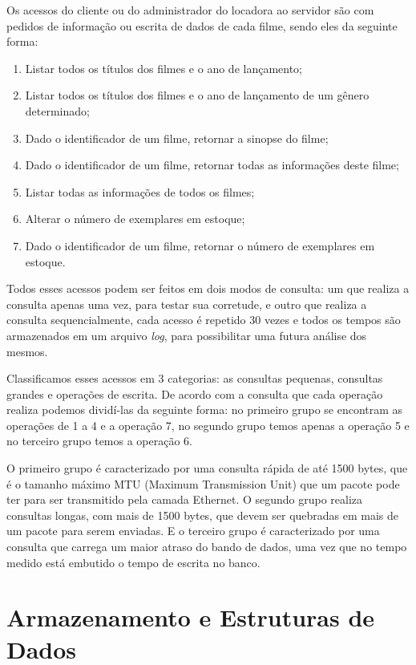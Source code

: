 \documentclass[12pt,a4paper]{article}
\newenvironment{myenumerate}{
\begin{enumerate}
 \setlength{\itemsep}{1pt}
 \setlength{\parskip}{0pt}
 \setlength{\parsep}{0pt}
}{\end{enumerate}}
\begin{document}
Os acessos do cliente ou do administrador do locadora ao servidor são com pedidos de informação ou escrita de dados de cada filme, sendo eles da seguinte forma:

\begin {myenumerate}
\item Listar todos os títulos dos filmes e o ano de lançamento;
\item Listar todos os títulos dos filmes e o ano de lançamento de um gênero determinado;
\item Dado o identificador de um filme, retornar a sinopse do filme;
\item Dado o identificador de um filme, retornar todas as informações deste filme;
\item Listar todas as informações de todos os filmes;
\item Alterar o número de exemplares em estoque;
\item Dado o identificador de um filme, retornar o número de exemplares
em estoque.
\end{myenumerate}

    Todos esses acessos podem ser feitos em dois modos de consulta: um que realiza a consulta apenas uma vez, para testar sua corretude, e outro que realiza a consulta sequencialmente, cada acesso é repetido 30 vezes e todos os tempos são armazenados em um arquivo {\it log}, para possibilitar uma futura análise dos mesmos.
    
    Classificamos esses acessos em 3 categorias: as consultas pequenas, consultas grandes e operações de escrita. De acordo com a consulta que cada operação realiza podemos dividí-las da seguinte forma: no primeiro grupo se encontram as operações de 1 a 4 e a operação 7, no segundo grupo temos apenas a operação 5 e no terceiro grupo temos a operação 6. 
    
O primeiro grupo é caracterizado por uma consulta rápida de até 1500 bytes, que é o tamanho máximo MTU (Maximum Transmission Unit) que um pacote pode ter para ser transmitido pela camada Ethernet. O segundo grupo realiza consultas longas, com mais de 1500 bytes, que devem ser quebradas em mais de um pacote para serem enviadas. E o terceiro grupo é caracterizado por uma consulta que carrega um maior atraso do bando de dados, uma vez que no tempo medido está embutido o tempo de escrita no banco.


\section{Armazenamento e Estruturas de Dados}
\end{document}
